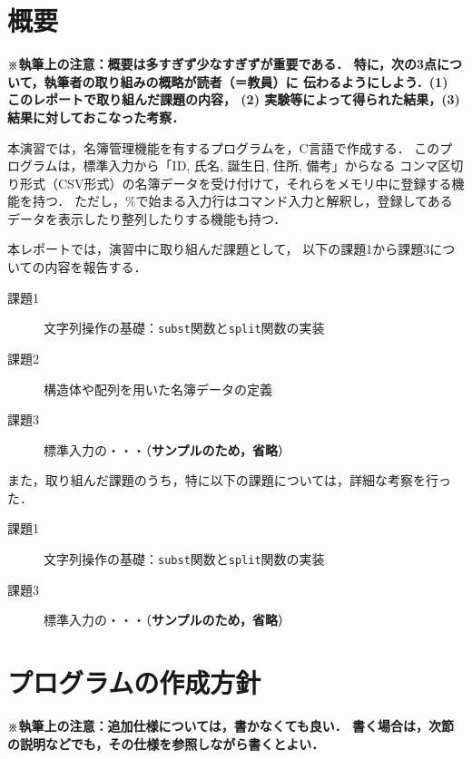 \section{概要} \label{sec:abstract}
\textbf{\small※執筆上の注意：概要は多すぎず少なすぎずが重要である．
    特に，次の3点について，執筆者の取り組みの概略が読者（＝教員）に
    伝わるようにしよう．(1) このレポートで取り組んだ課題の内容，
    (2) 実験等によって得られた結果，(3) 結果に対しておこなった考察．\\}

本演習では，名簿管理機能を有するプログラムを，C言語で作成する．
このプログラムは，標準入力から「ID, 氏名, 誕生日, 住所, 備考」からなる
コンマ区切り形式（CSV形式）の名簿データを受け付けて，それらをメモリ中に登録する機能を持つ．
ただし，\%で始まる入力行はコマンド入力と解釈し，登録してあるデータを表示したり整列したりする機能も持つ．

本レポートでは，演習中に取り組んだ課題として，
以下の課題1から課題3についての内容を報告する．
%
\begin{description}
  \item[課題1] 文字列操作の基礎：\verb|subst|関数と\verb|split|関数の実装
  \item[課題2] 構造体や配列を用いた名簿データの定義
  \item[課題3] 標準入力の・・・（\textbf{サンプルのため，省略}）
\end{description}
%
また，取り組んだ課題のうち，特に以下の課題については，詳細な考察を行った．
%
\begin{description}
  \item[課題1] 文字列操作の基礎：\verb|subst|関数と\verb|split|関数の実装
  \item[課題3] 標準入力の・・・（\textbf{サンプルのため，省略}）
\end{description}


\section{プログラムの作成方針}
\textbf{\small※執筆上の注意：追加仕様については，書かなくても良い．
    書く場合は，次節の説明などでも，その仕様を参照しながら書くとよい．\\}

